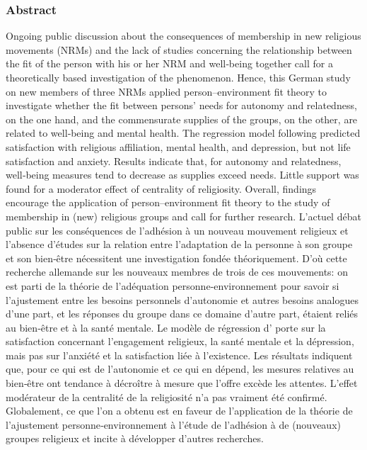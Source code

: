 \subsubsection*{Abstract}
Ongoing public discussion about the consequences of membership in new religious movements (NRMs) and the lack of studies concerning the relationship between the fit of the person with his or her NRM and well‐being together call for a theoretically based investigation of the phenomenon. Hence, this German study on new members of three NRMs applied person–environment fit theory to investigate whether the fit between persons’ needs for autonomy and relatedness, on the one hand, and the commensurate supplies of the groups, on the other, are related to well‐being and mental health. The regression model following predicted satisfaction with religious affiliation, mental health, and depression, but not life satisfaction and anxiety. Results indicate that, for autonomy and relatedness, well‐being measures tend to decrease as supplies exceed needs. Little support was found for a moderator effect of centrality of religiosity. Overall, findings encourage the application of person–environment fit theory to the study of membership in (new) religious groups and call for further research. L’actuel débat public sur les conséquences de l’adhésion à un nouveau mouvement religieux et l’absence d’études sur la relation entre l’adaptation de la personne à son groupe et son bien‐être nécessitent une investigation fondée théoriquement. D’où cette recherche allemande sur les nouveaux membres de trois de ces mouvements: on est parti de la théorie de l’adéquation personne‐environnement pour savoir si l’ajustement entre les besoins personnels d’autonomie et autres besoins analogues d’une part, et les réponses du groupe dans ce domaine d’autre part, étaient reliés au bien‐être et à la santé mentale. Le modèle de régression d’ porte sur la satisfaction concernant l’engagement religieux, la santé mentale et la dépression, mais pas sur l’anxiété et la satisfaction liée à l’existence. Les résultats indiquent que, pour ce qui est de l’autonomie et ce qui en dépend, les mesures relatives au bien‐être ont tendance à décroître à mesure que l’offre excède les attentes. L’effet modérateur de la centralité de la religiosité n’a pas vraiment été confirmé. Globalement, ce que l’on a obtenu est en faveur de l’application de la théorie de l’ajustement personne‐environnement à l’étude de l’adhésion à de (nouveaux) groupes religieux et incite à développer d’autres recherches.

